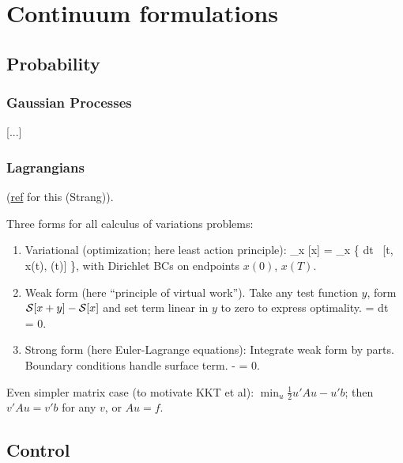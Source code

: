 \documentclass[notitlepage,openany,11pt]{report}
\theoremstyle{plain}%
\numberwithin{equation}{section}
\begin{document}
\chapter{Continuum formulations}

\section{Probability}


\subsection{Gaussian Processes}

[...]


\subsection{Lagrangians}
(\href{http://math.mit.edu/classes/18.086/2006/am72.pdf}{ref} for this (Strang)). 

Three forms for all calculus of variations problems:
\begin{enumerate}
\item Variational (optimization; here least action principle):
\be
\min_{x} [x] = \min_{x} \left\{ \int \! dt \, [t, x(t), (t)] \right\},
\ee with Dirichlet BCs on endpoints $x(0)$, $x(T)$. 
\item Weak form (here ``principle of virtual work''). Take any test function $y$, form $\mathcal{S}[x+y] - \mathcal{S}[x]$ and set term linear in $y$ to zero to express optimality. 
\be
\delta {} = \int dt \, = 0.
\ee
\item Strong form (here Euler-Lagrange equations): Integrate weak form by parts. Boundary conditions handle surface term.
\be
{} -   = 0.
\ee
\end{enumerate}
Even simpler matrix case (to motivate KKT et al): $\min_{u} \tfrac{1}{2} u' A u - u' b$; then $v' A u = v' b$ for any $v$, or $Au = f$.


\section{Control}
\end{document}
